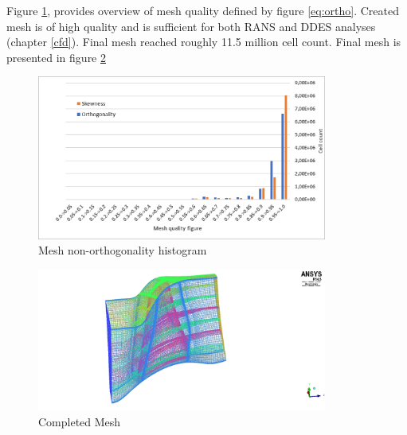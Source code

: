 Figure \ref{mesh-ortho}, provides overview of mesh quality defined by figure \ref{eq:ortho}. Created mesh is of high quality and is sufficient for both RANS and DDES analyses (chapter \ref{cfd}). Final mesh reached roughly 11.5 million cell count. Final mesh is presented in figure \ref{meshfinal} 

\begin{figure}[h!]
\centering %
\includegraphics[width=0.85\textwidth]{Pictures/mesh_ortho.png}
\caption{Mesh non-orthogonality histogram}
\label{mesh-ortho}
\end{figure}

\begin{figure}[t!]
\centering %
\includegraphics[width=0.85\textwidth]{Pictures/r67_ransmesh.jpg}
\caption{Completed Mesh}
\label{meshfinal}
\end{figure}

